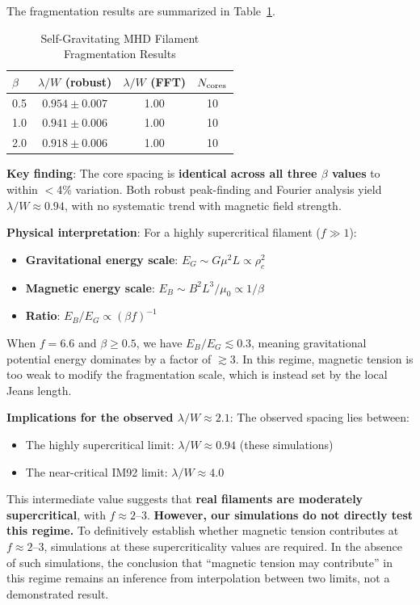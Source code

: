 \documentclass[11pt,a4paper]{article}
\begin{document}
The fragmentation results are summarized in Table~\ref{tab:mhd_sg}.

\begin{table}[H]
\centering
\caption{Self-Gravitating MHD Filament Fragmentation Results}
\label{tab:mhd_sg}
\begin{tabular}{lccc}
\toprule
$\beta$ & $\lambda/W$ (robust) & $\lambda/W$ (FFT) & $N_{\rm cores}$ \\
\midrule
0.5 & $0.954 \pm 0.007$ & 1.00 & 10 \\
1.0 & $0.941 \pm 0.006$ & 1.00 & 10 \\
2.0 & $0.918 \pm 0.006$ & 1.00 & 10 \\
\bottomrule
\end{tabular}
\end{table}

\textbf{Key finding}: The core spacing is \textbf{identical across all three $\beta$ values} to within $<$4\% variation. Both robust peak-finding and Fourier analysis yield $\lambda/W \approx 0.94$, with no systematic trend with magnetic field strength.

\textbf{Physical interpretation}: For a highly supercritical filament ($f \gg 1$):
\begin{itemize}
    \item \textbf{Gravitational energy scale}: $E_G \sim G \mu^2 L \propto \rho_c^2$
    \item \textbf{Magnetic energy scale}: $E_B \sim B^2 L^3 / \mu_0 \propto 1/\beta$
    \item \textbf{Ratio}: $E_B / E_G \propto (\beta f)^{-1}$
\end{itemize}
When $f = 6.6$ and $\beta \geq 0.5$, we have $E_B / E_G \lesssim 0.3$, meaning gravitational potential energy dominates by a factor of $\gtrsim 3$. In this regime, magnetic tension is too weak to modify the fragmentation scale, which is instead set by the local Jeans length.

\textbf{Implications for the observed $\lambda/W \approx 2.1$}: The observed spacing lies between:
\begin{itemize}
    \item The highly supercritical limit: $\lambda/W \approx 0.94$ (these simulations)
    \item The near-critical IM92 limit: $\lambda/W \approx 4.0$
\end{itemize}
This intermediate value suggests that \textbf{real filaments are moderately supercritical}, with $f \approx 2$--$3$. \textbf{However, our simulations do not directly test this regime.} To definitively establish whether magnetic tension contributes at $f \approx 2$--$3$, simulations at these supercriticality values are required. In the absence of such simulations, the conclusion that ``magnetic tension may contribute'' in this regime remains an inference from interpolation between two limits, not a demonstrated result.
\end{document}
